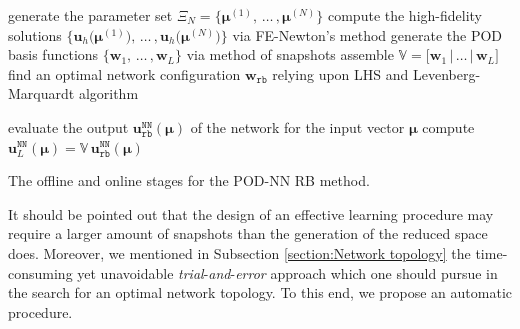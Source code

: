\documentclass[longtitle]{elsarticle}
\numberwithin{equation}{section}
\theoremstyle{theorem}
\theoremstyle{definition}
\theoremstyle{remark}
\theoremstyle{proposition}
\numberwithin{figure}{section}
\newcommand{\bg}[1]{\boldsymbol{#1}}
\begin{document}
		\begin{algorithm}[t!]	
			\begin{algorithmic}[1]
					\State generate the parameter set $\Xi_N = \big\lbrace \bg{\mu}^{(1)}, \, \ldots \, , \bg{\mu}^{(N)} \big\rbrace$
					\State compute the high-fidelity solutions $\big\lbrace \mathbf{u}_h \big( \bg{\mu}^{(1)} \big), \, \ldots \, , \mathbf{u}_h \big( \bg{\mu}^{(N)} \big) \big\rbrace$ via FE-Newton's method
					\State generate the POD basis functions $\big\lbrace \mathbf{w}_1, \, \ldots \, , \mathbf{w}_L \big\rbrace$ via method of snapshots
					\State assemble $\mathbb{V} = \big[ \mathbf{w}_1 \, \big| \, \ldots \, \big| \, \mathbf{w}_L \big]$
					\State find an optimal network configuration $\mathbf{w}_{\texttt{rb}}$ relying upon LHS and Levenberg-Marquardt algorithm
				\EndFunction
				
				\vspace*{0.3cm}
				
				\setcounter{ALG@line}{0}
				
				\Function{$\mathbf{u}_L^{\texttt{NN}} (\bg{\mu}) = $ \textsc{PODNN\_online}}{$\bg{\mu}$, $\mathbb{V}$, $\mathbf{w}_{\texttt{rb}}$}
					\State evaluate the output $\mathbf{u}_{\texttt{rb}}^{\texttt{NN}}(\bg{\mu})$ of the network for the input vector $\bg{\mu}$
					\State compute $\mathbf{u}_L^{\texttt{NN}} (\bg{\mu}) = \mathbb{V} \, \mathbf{u}_{\texttt{rb}}^{\texttt{NN}}(\bg{\mu})$
				\EndFunction
			\end{algorithmic}
			
			\caption{The offline and online stages for the POD-NN RB method.}
			\label{alg:pod-nn}
		\end{algorithm}
		
		It should be pointed out that the design of an effective learning procedure may require a larger amount of snapshots than the generation of the reduced space does. Moreover, we mentioned in Subsection \ref{section:Network topology} the time-consuming yet unavoidable \emph{trial}-\emph{and}-\emph{error} approach which one should pursue in the search for an optimal network topology. To this end, we propose an automatic procedure.
\end{document}
